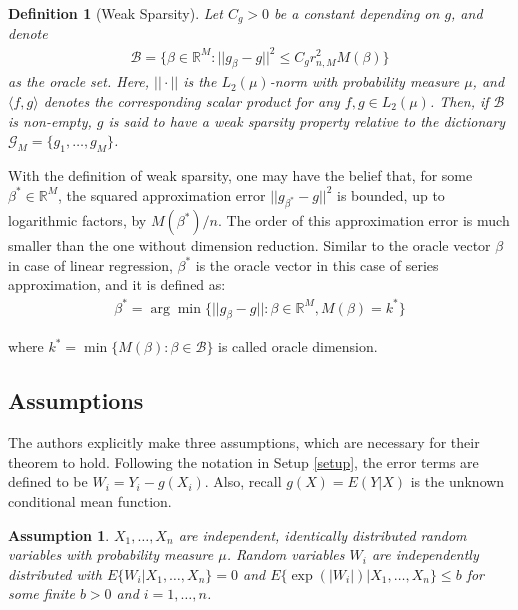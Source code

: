 \documentclass[12pt, a4paper]{article}
\theoremstyle{MAstyle} \newtheorem{assumption}{Assumption}[section]
\theoremstyle{MAstyle} \newtheorem{definition}{Definition}[section]
\theoremstyle{MAstyle} \newtheorem{theorem}{Theorem}[section]
\theoremstyle{MAstyle} \newtheorem{corollary}{Corollary}[section]
\begin{document}
                \begin{definition}[Weak Sparsity]\label{weak_sparsity}
                    Let $C_g >0$ be a constant depending on $g$, and denote 
                    \begin{align}
                    \mathcal{B}=\{\beta \in \mathbb{R}^M: ||g_{\beta}-g||^2 \le C_g r_{n,M}^2 M(\beta)\}
                    \end{align}
                    as the oracle set. Here, $||\cdot||$ is the $L_2(\mu)$-norm with probability measure $\mu$, and $\langle f,g\rangle$ denotes the corresponding scalar product for any $f,g \in L_2(\mu)$. Then, if $\mathcal{B}$ is non-empty, $g$ is said to have a weak sparsity property relative to the dictionary $\mathcal{G}_M=\{g_1,\ldots,g_M\}$.
                \end{definition}

                With the definition of weak sparsity, one may have the belief that, for some $\beta^* \in \mathbb{R}^M$, the squared approximation error $||g_{\beta^*}-g||^2$ is bounded, up to logarithmic factors, by $M(\beta^*)/n$. The order of this approximation error is much smaller than the one without dimension reduction. Similar to the oracle vector $\beta$ in case of linear regression, $\beta^*$ is the oracle vector in this case of series approximation, and it is defined as:
                \begin{align}
                    \beta^*=\arg\min\{ ||g_{\beta}-g||:\beta \in \mathbb{R}^M, M(\beta)=k^* \}
                \end{align}

                where $k^*=\min\{ M(\beta):\beta \in \mathcal{B}\}$ is called oracle dimension. 

            \subsection{Assumptions}\label{assumptions}
            The authors explicitly make three assumptions, which are necessary for their theorem to hold. Following the notation in Setup \ref{setup}, the error terms are defined to be $W_i=Y_i-g(X_i)$. Also, recall $g(X)=E(Y|X)$ is the unknown conditional mean function.
            \begin{assumption}\label{assumption_1}
                $X_1, \ldots, X_n$ are independent, identically distributed random variables with probability measure $\mu$. Random variables $W_i$ are independently distributed with $E\{W_i|X_1,\ldots,X_n\}=0$ and $E\{\exp(|W_i|)|X_1,\ldots,X_n\}\le b$ for some finite $b>0$ and $i=1,\ldots,n$.
            \end{assumption}
\end{document}
